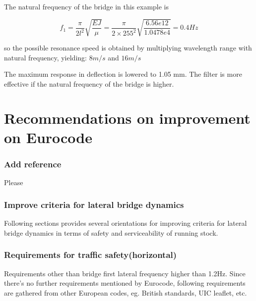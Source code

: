 The natural frequency of the bridge in this example is 

$$ f_1 = \frac{\pi}{2l^2}\sqrt{\frac{EJ}{\mu}} = \frac{\pi}{2\times 255^2}\sqrt{\frac{6.56e12}{1.0478e4}} = 0.4Hz$$

so the possible resonance speed is obtained by multiplying wavelength range with natural frequency, yielding: $8m/s$ and $16m/s$

The maximum response in deflection is lowered to 1.05 mm. The filter is more effective if the natural frequency of the bridge is higher.

\chapter{Recommendations on improvement on Eurocode}







\subsection{Add reference}
Please


\subsection{Improve criteria for lateral bridge dynamics}
Following sections provides several orientations for improving criteria for lateral bridge dynamics in terms of safety and serviceability of running stock.


\subsection{Requirements for traffic safety(horizontal)}
Requirements other than bridge first lateral frequency higher than 1.2Hz. Since there's no further requirements mentioned by Eurocode, following requirements are gathered from other European codes, eg. British standards, UIC leaflet, etc.

